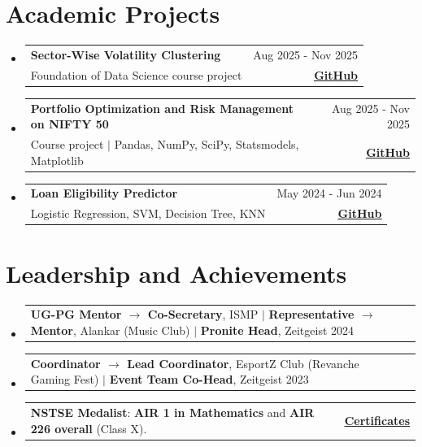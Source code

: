 \documentclass[letterpaper,11pt]{article}
\makeatletter
\newcommand{\resumeSubheading}[4]{
  \vspace{-2pt}\item
    \begin{tabular*}{0.97\textwidth}[t]{l@{\extracolsep{\fill}}r}
      \textbf{#1} & #2 \\
      #3 & #4 \\
    \end{tabular*}\vspace{-7pt}
}
\newcommand{\resumeProjectHeading}[2]{
    \item
    \begin{tabular*}{0.97\textwidth}{l@{\extracolsep{\fill}}r}
      \small#1 & #2 \\
    \end{tabular*}\vspace{-7pt}
}
\newcommand{\resumeSubHeadingListStart}{\begin{itemize}[leftmargin=0.15in, label={}]}
\newcommand{\resumeSubHeadingListEnd}{\end{itemize}}
\makeatother
\begin{document}
\section{\textbf{Academic Projects}}
    \resumeSubHeadingListStart
      \resumeSubheading
        {Sector-Wise Volatility Clustering}
        {Aug 2025 - Nov 2025}
        {Foundation of Data Science course project}
        {\href{https://github.com/KratinSh18/Sector-Wise-Volatility-Clustering}{\textbf{\underline{GitHub}}}}
      \resumeSubheading
        {Portfolio Optimization and Risk Management on NIFTY 50}
        {Aug 2025 - Nov 2025}
        {Course project $|$ Pandas, NumPy, SciPy, Statsmodels, Matplotlib}
        {\href{https://github.com/KratinSh18/Portfolio-Optimization-and-Risk-Management-using-Rolling-Backtests-on-NIFTY-50}{\textbf{\underline{GitHub}}}}
      \resumeSubheading
        {Loan Eligibility Predictor}
        {May 2024 - Jun 2024}
        {Logistic Regression, SVM, Decision Tree, KNN}
        {\href{https://github.com/KratinSh18/loan_prediction.git}{\textbf{\underline{GitHub}}}}
    \resumeSubHeadingListEnd
\vspace{-1mm}

\section{\textbf{Leadership and Achievements}}
\begin{itemize}[leftmargin=0.15in, label={}]
    \resumeProjectHeading{
    \textbf{UG-PG Mentor $\rightarrow$ Co-Secretary}, ISMP $|$ \textbf{Representative $\rightarrow$ Mentor}, Alankar (Music Club) $|$ \textbf{Pronite Head}, Zeitgeist 2024
    }{}
    \resumeProjectHeading{
    \textbf{Coordinator $\rightarrow$ Lead Coordinator}, EsportZ Club (Revanche Gaming Fest) $|$ \textbf{Event Team Co-Head}, Zeitgeist 2023
    }{}
    \resumeProjectHeading{
    \textbf{NSTSE Medalist}: \textbf{AIR 1 in Mathematics} and \textbf{AIR 226 overall} (Class X).
    }{{\href{https://drive.google.com/drive/u/0/folders/10KIQBDxHXWHUeHLHexosrobPeqJApp4Q}{\textbf{\underline{Certificates}}}}}
\end{itemize}

\end{document}

